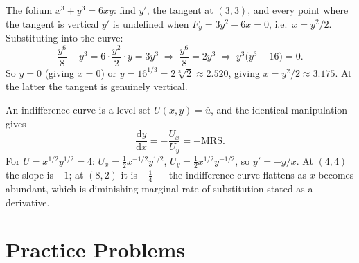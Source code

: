 \begin{worked}{The folium $x^{3}+y^{3}=6xy$: find $y'$, the tangent at $(3,3)$, and every point where the tangent is vertical}
$y'$ is undefined when $F_{y}=3y^{2}-6x=0$, i.e.\ $x=y^{2}/2$. Substituting into
the curve:
\[
  \frac{y^{6}}{8}+y^{3}=6\cdot\frac{y^{2}}{2}\cdot y=3y^{3}
  \;\Longrightarrow\;
  \frac{y^{6}}{8}=2y^{3}
  \;\Longrightarrow\;
  y^{3}\bigl(y^{3}-16\bigr)=0 .
\]
So $y=0$ (giving $x=0$) or $y=16^{1/3}=2\sqrt[3]{2}\approx2.520$, giving
$x=y^{2}/2\approx3.175$. At the latter the tangent is genuinely vertical.

An indifference curve is a level set $U(x,y)=\bar u$, and the identical
manipulation gives
\[
  \frac{\mathrm{d}y}{\mathrm{d}x}=-\frac{U_{x}}{U_{y}}=-\mathrm{MRS} .
\]
For $U=x^{1/2}y^{1/2}=4$: $U_{x}=\tfrac12x^{-1/2}y^{1/2}$,
$U_{y}=\tfrac12x^{1/2}y^{-1/2}$, so $y'=-y/x$. At $(4,4)$ the slope is
$-1$; at $(8,2)$ it is $-\tfrac14$ --- the indifference curve flattens as
$x$ becomes abundant, which is diminishing marginal rate of substitution
stated as a derivative.
\end{worked}

\section{Practice Problems}

